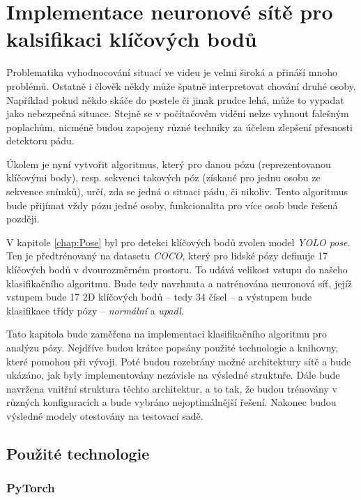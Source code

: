 \chapter{Implementace neuronové sítě pro kalsifikaci klíčových bodů}
\label{chap:ClassificationImplementation}

Problematika vyhodnocování situací ve videu je velmi široká a přináší mnoho
problémů. Ostatně i člověk někdy může špatně interpretovat chování druhé osoby.
Například pokud někdo skáče do postele či jinak prudce lehá, může to vypadat
jako nebezpečná situace. Stejně se v počítačovém vidění nelze vyhnout falešným
poplachům, nicméně budou zapojeny různé techniky za účelem zlepšení přesnosti
detektoru pádu.

Úkolem je nyní vytvořit algoritmus, který pro danou pózu (reprezentovanou
klíčovými body), resp. sekvenci takových póz (získané pro jednu osobu ze
sekvence snímků), určí, zda se jedná o situaci pádu, či nikoliv. Tento
algoritmus bude přijímat vždy pózu jedné osoby, funkcionalita pro více osob
bude řešená později.

V kapitole \ref{chap:Pose} byl pro detekci klíčových bodů zvolen model
\textit{YOLO pose}. Ten je předtrénovaný na datasetu \textit{COCO}, který pro
lidské pózy definuje 17 klíčových bodů v dvourozměrném prostoru. To udává
velikost vstupu do našeho klasifikačního algoritmu. Bude tedy navrhnuta a
natrénována neuronová síť, jejíž vstupem bude 17 2D klíčových bodů – tedy 34
čísel – a výstupem bude klasifikace třídy pózy – \textit{normální} a
\textit{upadl}.

Tato kapitola bude zaměřena na implementaci klasifikačního algoritmu pro
analýzu pózy. Nejdříve budou krátce popsány použité technologie a knihovny,
které pomohou při vývoji. Poté budou rozebrány možné architektury sítě a bude
ukázáno, jak byly implementovány nezávisle na výsledné struktuře. Dále bude
navržena vnitřní struktura těchto architektur, a to tak, že budou trénovány v
různých konfiguracích a bude vybráno nejoptimálnější řešení. Nakonec budou
výsledné modely otestovány na testovací sadě.

\section{Použité technologie}

\subsection{PyTorch}

